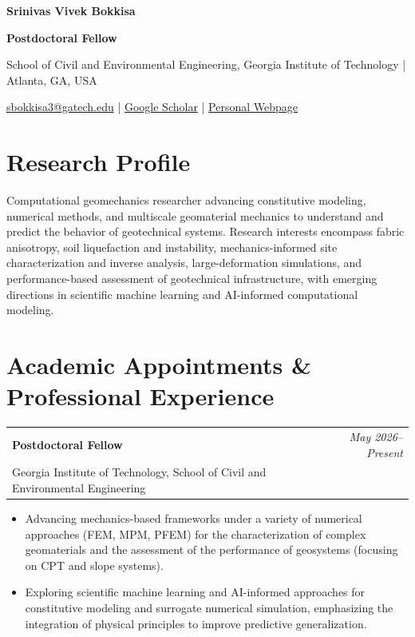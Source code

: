 \documentclass[10pt,letterpaper]{article}
\makeatletter
\newcommand{\entry}[3]{%
  \begin{tabularx}{\textwidth}{@{}X r@{}}
    \textbf{#1} & \textit{#3}\\[-1pt]
    \textcolor{midgray}{#2} &
  \end{tabularx}\vspace{-1pt}
}
\makeatother
\begin{document}
{\fontsize{20}{22}\selectfont\bfseries\color{charcoal} Srinivas Vivek Bokkisa}\par
\vspace{3pt}
{\large\bfseries\color{navy} Postdoctoral Fellow}\par
\vspace{2pt}
{\small School of Civil and Environmental Engineering, Georgia Institute of Technology | Atlanta, GA, USA}\par
\vspace{5pt}
{\small
\href{mailto:sbokkisa3@gatech.edu}{sbokkisa3@gatech.edu}
\;|\;
\href{https://scholar.google.com/citations?user=DLtSDLgAAAAJ\&hl=en}{Google Scholar}
\;|\;
\href{https://srinivas12viv.github.io/}{Personal Webpage}}


\section{Research Profile}
Computational geomechanics researcher advancing
constitutive modeling, numerical methods, and
multiscale geomaterial mechanics to understand and
predict the behavior of geotechnical systems.
Research interests encompass fabric anisotropy,
soil liquefaction and instability, mechanics-informed
site characterization and inverse analysis,
large-deformation simulations, and performance-based
assessment of geotechnical infrastructure, with
emerging directions in scientific machine learning
and AI-informed computational modeling.
\par


\section{Academic Appointments \& Professional Experience}

\entry{Postdoctoral Fellow}
{Georgia Institute of Technology,
School of Civil and Environmental Engineering}
{May 2026--Present}
\begin{itemize}
\item Advancing mechanics-based frameworks under a variety of numerical approaches (FEM, MPM, PFEM) for the characterization of complex geomaterials and the assessment of the performance of geosystems (focusing on CPT and slope systems). 

\item Exploring scientific machine learning
and AI-informed approaches for constitutive
modeling and surrogate numerical simulation,
emphasizing the integration of physical principles
to improve predictive generalization.
\end{itemize}
\end{document}
